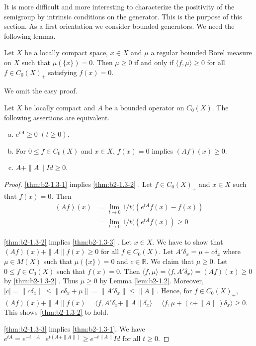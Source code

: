 It is more difficult and more interesting to characterize the positivity of the semigroup by intrinsic conditions on the generator.
This is the purpose of this section.
As a first orientation we consider bounded generators.
We need the following lemma.
\begin{lemma}\label{lem:b2-1.2}
Let $X$ be a locally compact space, $x \in X$ and $\mu$ a regular bounded Borel measure on $X$ such that $\mu(\{x\}) = 0$.
Then $\mu \geq 0$ if and only if $\langle f,\mu \rangle \geq 0$ for all $f \in C_{0}(X)_{+}$ satisfying $f(x) = 0$.
\end{lemma}

We omit the easy proof.

\begin{theorem}\label{thm:b2-1.3}
Let $X$ be locally compact and $A$ be a bounded operator on $C_{0}(X)$.
The following assertions are equivalent.
\begin{enumerate}[(a)]
\item \label{thm:b2-1.3-1}
$e^{tA} \geq 0$ $(t \geq 0)$.
\item \label{thm:b2-1.3-2}
For $0 \leq f \in C_{0}(X)$ and $x \in X$, $f(x) = 0$ implies $(Af)(x) \geq 0$.
\item \label{thm:b2-1.3-3}
$A + \|A\|Id \geq 0$.
\end{enumerate}
\end{theorem}

\begin{proof}
\ref{thm:b2-1.3-1} implies \ref{thm:b2-1.3-2} .
Let $f \in C_{0}(X)_{+}$ and $x \in X$ such that $f(x) = 0$.
Then
\begin{align*}
(Af)(x) &= \lim_{t \to 0} 1/t ((e^{tA}f(x) - f(x)) \\
&= \lim_{t \to 0} 1/t ((e^{tA}f(x)) \geq 0
\end{align*}

\ref{thm:b2-1.3-2} implies \ref{thm:b2-1.3-3} .
Let $x \in X$.
We have to show that $(Af)(x) + \|A\|f(x) \geq 0$ for all $f \in C_{0}(X)$.
Let $A'\delta_{x} = \mu + c\delta_{x}$ where $\mu \in M(X)$ such that $\mu(\{x\}) = 0$ and $c \in \mathbb{R}$.
We claim that $\mu \geq 0$.
Let $0 \leq f \in C_{0}(X)$ such that $f(x) = 0$.
Then $\langle f,\mu \rangle = \langle f,A'\delta_{x} \rangle = (Af)(x) \geq 0$ by \ref{thm:b2-1.3-2} .
Thus $\mu \geq 0$ by Lemma \ref{lem:b2-1.2}.
Moreover, $|c| = \|c\delta_{x}\| \leq \|c\delta_{x} + \mu\| = \|A'\delta_{x}\| \leq \|A\|$.
Hence, for $f \in C_{0}(X)_{+}$,
$(Af)(x) + \|A\|f(x) = \langle f, A'\delta_{x} + \|A\|\delta_{x} \rangle = \langle f, \mu + (c+\|A\|)\delta_{x} \rangle \geq 0$.
This shows  \ref{thm:b2-1.3-2} to hold.

\ref{thm:b2-1.3-3} implies \ref{thm:b2-1.3-1}.
We have 
$e^{tA} = e^{-t\|A\|}e^{t(A+\|A\|)} \geq e^{-t\|A\|}Id$ for all $t \geq 0$.
\end{proof}

